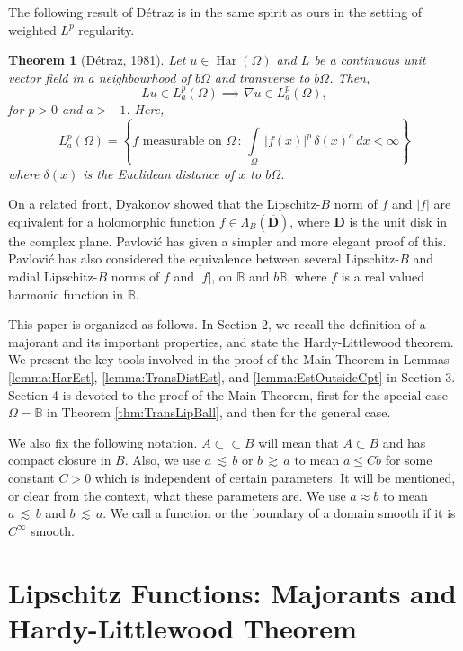 \documentclass[12pt,a4paper]{amsart}
\numberwithin{equation}{section}
\newtheorem*{thmnonum}{Theorem}
\theoremstyle{definition}
\begin{document}
The following result of D\'{e}traz \cite{Det81} is in the same spirit as ours in the setting of weighted $L^p$ regularity. 
\begin{thmnonum}[D\'{e}traz, 1981] Let $u\in\operatorname{\operatorname{Har}}(\Omega)$ and $L$ be a continuous unit vector field in a neighbourhood of $b\Omega$ and transverse to $b\Omega$. 
Then, 
\[Lu\in L^p_a(\Omega) \implies \nabla u \in L^p_a(\Omega),\] 
for $p>0$ and $a>-1$. Here, 
\[L^p_a(\Omega) = \left\{ f \text{ measurable on } \Omega\, :\, \int\limits_\Omega\, {\left\lvert{f(x)}\right\rvert}^p\,\delta(x)^a\, dx < \infty\right\}\]
where $\delta(x)$ is the Euclidean distance of $x$ to $b\Omega$.
\end{thmnonum}

On a related front, Dyakonov \cite{Dya97} showed that the Lipschitz-$B$ norm of $f$ and ${\left\lvert{f}\right\rvert}$ are equivalent for a holomorphic function $f\in\Lambda_B(\overline{\mathbf{D}})$, where $\mathbf{D}$ is the unit 
disk in the complex plane. Pavlovi\'{c} \cite{Pav99} has given a simpler and more elegant proof of this. Pavlovi\'{c} \cite{Pav07-LipHarmonic} has also considered the equivalence between several Lipschitz-$B$ and radial Lipschitz-$B$ norms of $f$ and ${\left\lvert{f}\right\rvert}$, on $\mathbb{B}$ and $b\mathbb{B}$, where $f$ is a real valued harmonic function in $\mathbb{B}$.

This paper is organized as follows. In Section 2, we recall the definition of a majorant and its important properties, and state the Hardy-Littlewood theorem. We present the key tools involved in the proof of the 
Main Theorem in Lemmas \ref{lemma:HarEst}, \ref{lemma:TransDistEst}, and \ref{lemma:EstOutsideCpt} in Section 3. Section 4 is devoted to the proof of the Main Theorem, first for the special case 
$\Omega=\mathbb{B}$ in Theorem \ref{thm:TransLipBall}, and then for the general case.

We also fix the following notation. $A\subset\subset B$ will mean that $A\subset B$ and has compact closure in $B$. Also, we use $a\,\lesssim\,b$ or $b\,\gtrsim\,a$ to mean $a \le 
Cb$ for some constant $C>0$ which is independent of certain parameters. It will be mentioned, or clear from the context, what these parameters are. We use $a \approx b$ to mean $a\,\lesssim\,b$ and $b\,
\lesssim\,a$. We call a function or the boundary of a domain smooth if it is $C^\infty$ smooth.

\section{Lipschitz Functions: Majorants and Hardy-Littlewood Theorem}
\end{document}
